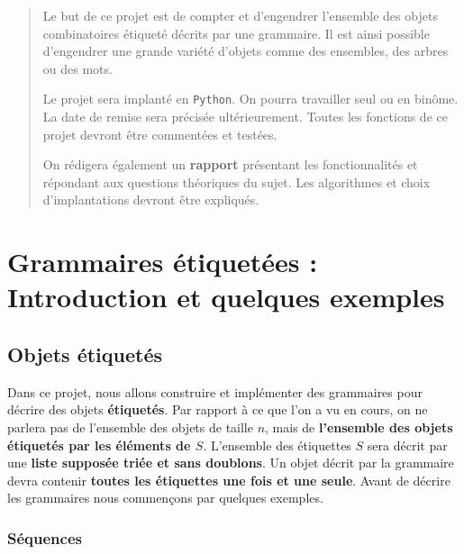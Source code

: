 \documentclass[11pt]{article}
\newcommand{\Python}{\texttt{Python}}
\begin{document}
\maketitle

\begin{abstract}
  Le but de ce projet est de compter et d'engendrer l'ensemble des objets
  combinatoires étiqueté décrits par une grammaire. Il est ainsi possible
  d'engendrer une grande variété d'objets comme des ensembles, des arbres ou
  des mots.  \smallskip

  Le projet sera implanté en \Python{}. On pourra travailler seul ou en
  binôme. La date de remise sera précisée ultérieurement. Toutes les fonctions
  de ce projet devront être commentées et testées.

  On rédigera également un \textbf{rapport} présentant les fonctionnalités et
  répondant aux questions théoriques du sujet. Les algorithmes et choix
  d'implantations devront être expliqués. 
\end{abstract}

\section{Grammaires étiquetées : Introduction et quelques exemples}

\subsection{Objets étiquetés}


Dans ce projet, nous allons construire et implémenter des grammaires pour
décrire des objets \textbf{étiquetés}. Par rapport à ce que l'on a vu en
cours, on ne parlera pas de l'ensemble des objets de taille $n$, mais de
\textbf{l'ensemble des objets étiquetés par les éléments de $S$}. L'ensemble
des étiquettes $S$ sera décrit par une \textbf{liste supposée triée et sans
  doublons}. Un objet décrit par la grammaire devra contenir \textbf{toutes
  les étiquettes une fois et une seule}. Avant de décrire les grammaires nous
commençons par quelques exemples.

\subsubsection{Séquences}
\label{seq:sequences}
\end{document}
